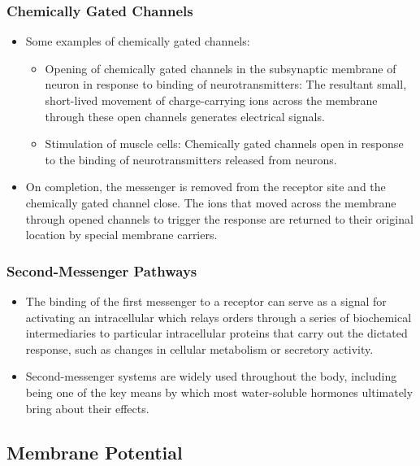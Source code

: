 \documentclass{article}
\numberwithin{equation}{section}
\begin{document}
\subsubsection{Chemically Gated Channels}
\begin{itemize}
    \item Some examples of chemically gated channels:
    \begin{itemize}
        \item Opening of chemically gated channels in the subsynaptic membrane of neuron in response to binding of neurotransmitters: The resultant small, short-lived movement of charge-carrying ions across the membrane through these open channels generates electrical signals.
        \item Stimulation of muscle cells: Chemically gated channels open in response to the binding of neurotransmitters released from neurons.
    \end{itemize}
    \item On completion, the messenger is removed from the receptor site and the chemically gated channel close. The ions that moved across the membrane through opened channels to trigger the response are returned to their original location by special membrane carriers.
\end{itemize}
\subsubsection{Second-Messenger Pathways}
\begin{itemize}
    \item The binding of the first messenger to a receptor can serve as a signal for activating an intracellular  which relays orders through a series of biochemical intermediaries to particular intracellular proteins that carry out the dictated response, such as changes in cellular metabolism or secretory activity.
    \item Second-messenger systems are widely used throughout the body, including being one of the key means by which most water-soluble hormones ultimately bring about their effects.
\end{itemize}
\subsection{Membrane Potential}
\end{document}
